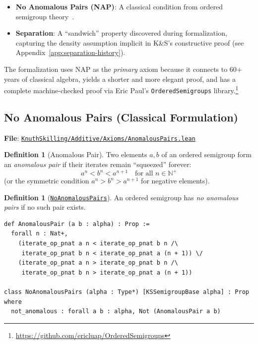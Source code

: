 \documentclass[11pt]{article}
\theoremstyle{definition}
\newtheorem{definition}[theorem]{Definition}
\theoremstyle{remark}
\begin{document}
\begin{itemize}
\item \textbf{No Anomalous Pairs (NAP)}: A classical condition from ordered semigroup theory~\cite{Alimov1950,Fuchs1963}.
\item \textbf{Separation}: A ``sandwich'' property discovered during formalization, capturing the
      density assumption implicit in K\&S's constructive proof (see Appendix~\ref{app:separation-history}).
\end{itemize}

The formalization uses NAP as the \emph{primary} axiom because it connects to 60+ years of
classical algebra, yields a shorter and more elegant proof, and has a complete machine-checked
proof via Eric Paul's \texttt{OrderedSemigroups} library.\footnote{\url{https://github.com/ericluap/OrderedSemigroups}}

\subsection{No Anomalous Pairs (Classical Formulation)}
\label{subsec:nap}

\textbf{File}: \href{https://github.com/zariuq/ks-foundations-of-inference/blob/main/KnuthSkilling/Additive/Axioms/AnomalousPairs.lean}{\texttt{KnuthSkilling/Additive/Axioms/AnomalousPairs.lean}}

\begin{definition}[Anomalous Pair]
Two elements $a, b$ of an ordered semigroup form an \emph{anomalous pair} if their iterates remain
``squeezed'' forever:
\[
  a^n < b^n < a^{n+1} \quad \text{for all } n \in \mathbb{N}^+
\]
(or the symmetric condition $a^n > b^n > a^{n+1}$ for negative elements).
\end{definition}

\begin{definition}[\href{https://github.com/zariuq/ks-foundations-of-inference/blob/main/KnuthSkilling/Additive/Axioms/AnomalousPairs.lean\#L40}{\texttt{NoAnomalousPairs}}]
An ordered semigroup has \emph{no anomalous pairs} if no such pair exists.
\end{definition}

\begin{lstlisting}[caption={NAP definition (following Eric Paul's OrderedSemigroups)}]
def AnomalousPair (a b : alpha) : Prop :=
  forall n : Nat+,
    (iterate_op_pnat a n < iterate_op_pnat b n /\
     iterate_op_pnat b n < iterate_op_pnat a (n + 1)) \/
    (iterate_op_pnat a n > iterate_op_pnat b n /\
     iterate_op_pnat b n > iterate_op_pnat a (n + 1))

class NoAnomalousPairs (alpha : Type*) [KSSemigroupBase alpha] : Prop where
  not_anomalous : forall a b : alpha, Not (AnomalousPair a b)
\end{lstlisting}
\end{document}
